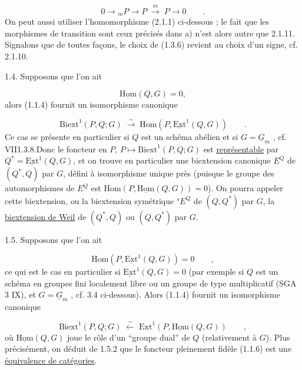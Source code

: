 \begin{equation*}
0 \longrightarrow {}_mP \longrightarrow P \;\stackrel{m}{\longrightarrow}\; P \longrightarrow 0 \qquad .
\end{equation*}
On peut aussi utiliser l'homomorphisme (2.1.1) ci-dessous ; le fait que les morphismes de transition sont ceux précisés dans a) n'est alors autre que 2.1.11. Signalons que de toutes façons, le choix de (1.3.6) revient au choix d'un signe, cf. 2.1.10.

1.4.  Supposons que l'on ait

\begin{equation}\tag{1.4.1}
\underline{\mathrm{Hom}}(Q,G) = 0,
\end{equation}
alors (1.1.4) fournit un isomorphisme canonique

\begin{equation}\tag{1.4.2}
\mathrm{Biext}^1(P,Q;G) \;\stackrel{\sim}{\longrightarrow}\; \mathrm{Hom}(P, \underline{\mathrm{Ext}}^1(Q,G)) \qquad .
\end{equation}
Ce cas se présente en particulier si $Q$ est un schéma abélien et si $G = \underline{G}_m$ , cf. VII1.3.8.Donc le foncteur en $P$, $P \longmapsto \mathrm{Biext}^1(P,Q;G)$ est \underline{représentable} par $Q^* = \underline{\mathrm{Ext}}^1(Q,G)$, et on trouve en particulier une biextension canonique $E^Q$ de $(Q^*,Q)$ par $G$, défini à isomorphisme unique près (puisque le groupe des automorphismes de $E^Q$ est $\mathrm{Hom}(P,\underline{\mathrm{Hom}}(Q,G)) = 0$). On pourra appeler cette biextension, ou la biextension symétrique ${}^sE^Q$ de $(Q,Q^*)$ par $G$, la \underline{biextension de Weil} de $(Q^*,Q)$ ou $(Q,Q^*)$ par $G$.

1.5.  Supposons que l'on ait

\begin{equation}\tag{1.5.1}
\mathrm{Hom}(P, \underline{\mathrm{Ext}}^1(Q,G)) = 0 \qquad ,
\end{equation}
ce qui est le cas en particulier si $\underline{\mathrm{Ext}}^1(Q,G) = 0$ (par exemple si $Q$ est un schéma en groupes fini localement libre ou un groupe de type multiplicatif (SGA 3 IX), et $G = \underline{G}_m$ , cf. 3.4 ci-dessous). Alors (1.1.4) fournit un isomorphisme canonique

\begin{equation}\tag{1.5.2}
\mathrm{Biext}^1(P,Q; G) \;\stackrel{\sim}{\longleftarrow}\; \mathrm{Ext}^1(P,\underline{\mathrm{Hom}}(Q,G)) \qquad ,
\end{equation}
où $\underline{\mathrm{Hom}}(Q,G)$ joue le rôle d'un ``groupe dual'' de $Q$ (relativement à $G$). Plus précisément, on déduit de 1.5.2 que le foncteur pleinement fidèle (1.1.6) est une \underline{équivalence de catégories}.

